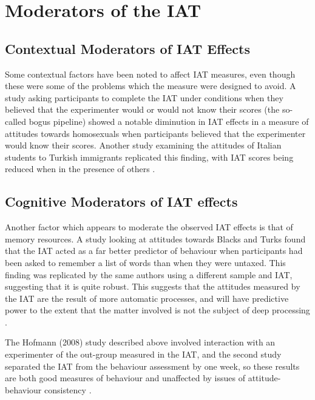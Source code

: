 \section{Moderators of the IAT}
\label{sec:moderators-iat}



\subsection{Contextual Moderators of IAT Effects}
\label{sec:cont-moder-iat}



Some contextual factors have been noted to affect IAT measures, even though these were some of the problems which the measure were designed to avoid. A study asking participants to complete the IAT under conditions when they believed that the experimenter would or would not know their scores (the so-called bogus pipeline) \cite{Boysen2006} showed a notable diminution in IAT effects in a measure of attitudes towards homosexuals when participants believed that the experimenter would know their scores. %
Another study examining the attitudes of Italian students to Turkish immigrants replicated this finding, with IAT scores being reduced when in the presence of others \cite{Castelli2008}. 

\subsection{Cognitive Moderators of IAT effects}
\label{sec:cogn-moder-iat}



Another factor which appears to moderate the observed IAT effects is that of memory resources. A study looking at attitudes towards Blacks and Turks \cite{Hofmann2008a} found that the IAT acted as a far better predictor of behaviour when participants had been asked to remember a list of words than when they were untaxed. This finding was replicated by the same authors using a different sample and IAT, suggesting that it is quite robust.  This suggests that the attitudes measured by the IAT are the result of more automatic processes, and will have predictive power to the extent that the matter involved is not the subject of deep processing \cite{Kahneman2002}. 

The Hofmann (2008) study described above involved interaction with an experimenter of the out-group measured in the IAT, and the second study separated the IAT from the behaviour assessment by one week, so these results are both good measures of behaviour and unaffected by  issues of attitude-behaviour consistency . 

